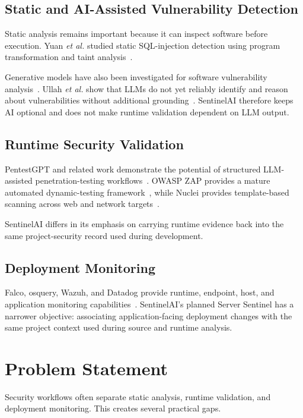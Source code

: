 \documentclass[journal]{IEEEtran}
\begin{document}
\subsection{Static and AI-Assisted Vulnerability Detection}

Static analysis remains important because it can inspect software before
execution. Yuan \textit{et al.} studied static SQL-injection detection using
program transformation and taint analysis~\cite{b5}.

Generative models have also been investigated for software vulnerability
analysis~\cite{b10,b11}. Ullah \textit{et al.} show that LLMs do not yet
reliably identify and reason about vulnerabilities without additional
grounding~\cite{b13}. SentinelAI therefore keeps AI optional and does not
make runtime validation dependent on LLM output.

\subsection{Runtime Security Validation}

PentestGPT and related work demonstrate the potential of structured
LLM-assisted penetration-testing workflows~\cite{b7,b8}. OWASP ZAP provides
a mature automated dynamic-testing framework~\cite{zap}, while Nuclei
provides template-based scanning across web and network targets~\cite{nuclei}.

SentinelAI differs in its emphasis on carrying runtime evidence back into the
same project-security record used during development.

\subsection{Deployment Monitoring}

Falco, osquery, Wazuh, and Datadog provide runtime, endpoint, host, and
application monitoring capabilities~\cite{falco,osquery,wazuhagent,datadogagent}.
SentinelAI's planned Server Sentinel has a narrower objective: associating
application-facing deployment changes with the same project context used
during source and runtime analysis.

\section{Problem Statement}

Security workflows often separate static analysis, runtime validation, and
deployment monitoring. This creates several practical gaps.
\end{document}
